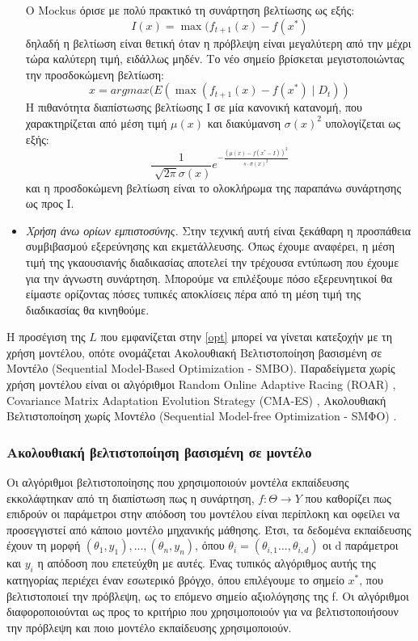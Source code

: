 \begin{itemize}
 		O Mockus όρισε με πολύ πρακτικό τη συνάρτηση βελτίωσης ως εξής:
 		$$I(x)= \max ( f_{t+1} (x) - f(x^*)$$
 		δηλαδή η βελτίωση είναι θετική όταν η πρόβλεψη είναι μεγαλύτερη από την μέχρι τώρα καλύτερη τιμή, ειδάλλως μηδέν. Το νέο σημείο βρίσκεται μεγιστοποιώντας την προσδοκώμενη βελτίωση:
 		$$x=argmax(E( \max( f_{t+1}(x) - f(x^*) \mid D_t))$$
 		H πιθανότητα διαπίστωσης βελτίωσης I σε μία κανονική κατανομή, που χαρακτηρίζεται από μέση τιμή $\mu(x)$ και διακύμανση $\sigma(x)^2$ υπολογίζεται ως εξής:
 		$$ \frac{1}{\sqrt[]{2 \pi} \sigma(x)} e^{- \frac{(\mu(x)- f(x^*-I))^2}{s \cdot \sigma(x)^2}}$$
 		και η προσδοκώμενη βελτίωση είναι το ολοκλήρωμα της παραπάνω συνάρτησης ως προς I.
 		\item \textit{Χρήση άνω ορίων εμπιστοσύνης.} Στην τεχνική αυτή είναι ξεκάθαρη η προσπάθεια συμβιβασμού εξερεύνησης και εκμετάλλευσης. Όπως έχουμε αναφέρει, η μέση τιμή της γκαουσιανής διαδικασίας αποτελεί την τρέχουσα εντύπωση που έχουμε για την άγνωστη συνάρτηση. Μπορούμε να επιλέξουμε πόσο εξερευνητικοί θα είμαστε ορίζοντας πόσες τυπικές αποκλίσεις πέρα από τη μέση τιμή της διαδικασίας θα κινηθούμε.
 	\end{itemize} 	
 	
 	Η προσέγιση της $L$ που εμφανίζεται στην \ref{opt} μπορεί να γίνεται κατεξοχήν με τη χρήση μοντέλου, οπότε ονομάζεται Ακολουθιακή Βελτιστοποίηση βασισμένη σε Μοντέλο (Sequential Model-Based Optimization - SMBO). Παραδείγμετα χωρίς χρήση μοντέλου είναι οι αλγόριθμοι Random Online Adaptive Racing (ROAR) \citep{Hutter2011}, Covari\-ance Matrix Adaptation Evolution Strategy (CMA-ES) \citep{DBLP:journals/corr/LoshchilovH16},  Ακολουθιακή Βελτιστοποίηση χωρίς Μοντέλο (Sequential Model-free Optimization - SMΦO)  \citep{7373431}. 
 \subsubsection{Ακολουθιακή βελτιστοποίηση βασισμένη σε μοντέλο}
 Οι αλγόριθμοι βελτιστοποίησης που χρησιμοποιούν μοντέλα εκπαίδευσης εκκολάφτηκαν από τη διαπίστωση πως η συνάρτηση, $f: \Theta \rightarrow Y$ που καθορίζει πως επιδρούν οι παράμετροι στην απόδοση του μοντέλου είναι περίπλοκη και οφείλει να προσεγγιστεί από κάποιο μοντέλο μηχανικής μάθησης. Έτσι, τα δεδομένα εκπαίδευσης έχουν τη μορφή ${(\theta_1,y_1),...,(\theta_n,y_n)}$, όπου $\theta_i=(\theta_{i,1}..., \theta_{i,d})$ οι d παράμετροι και $y_i$ η απόδοση που επετεύχθη με αυτές. Ένας τυπικός αλγόριθμος αυτής της κατηγορίας περιέχει έναν εσωτερικό βρόγχο, όπου επιλέγουμε το σημείο $x^*$, που βελτιστοποιεί την πρόβλεψη, ως το επόμενο σημείο αξιολόγησης της f. Οι αλγόριθμοι διαφοροποιούνται ως προς το κριτήριο που χρησιμοποιούν για να βελτιστοποιήσουν την πρόβλεψη και ποιο μοντέλο εκπαίδευσης χρησιμοποιούν.
 
